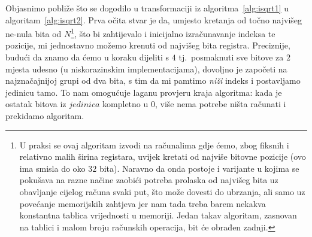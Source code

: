 \documentclass[12pt]{scrartcl}
\begin{document}
Objasnimo pobliže što se dogodilo u transformaciji iz algoritma~\ref{alg:isqrt1} u algoritam~\ref{alg:isqrt2}. Prva očita stvar je da, umjesto kretanja
od točno najvišeg ne-nula bita od $N$\footnote{U praksi se ovaj algoritam izvodi na računalima gdje ćemo, zbog fiksnih
i relativno malih širina registara, uvijek kretati od najviše bitovne pozicije (ovo ima smisla do oko $32$ bita).
Naravno da onda postoje i varijante u kojima se pokušava na razne načine
zaobići potreba prolaska od najvišeg bita uz obavljanje cijelog računa svaki put, što može dovesti do ubrzanja, ali samo uz povećanje
memorijskih zahtjeva jer nam tada treba barem nekakva konstantna tablica vrijednosti u memoriji.
Jedan takav algoritam, zasnovan na tablici i malom broju računskih operacija,
bit će obrađen zadnji.}, što bi zahtijevalo i inicijalno izračunavanje indeksa te pozicije, mi jednostavno možemo krenuti od najvišeg bita registra.
Preciznije, budući da znamo da ćemo u koraku dijeliti s $4$ tj.\ posmaknuti sve bitove za $2$ mjesta udesno (u niskorazinskim implementacijama), dovoljno
je započeti na najznačajnijoj grupi od dva bita, s tim da mi pamtimo \emph{niži} indeks i postavljamo jedinicu tamo.  To nam omogućuje laganu provjeru
kraja algoritma: kada je ostatak bitova iz $jedinica$ kompletno u $0$, više nema potrebe ništa računati i prekidamo algoritam.
\end{document}
